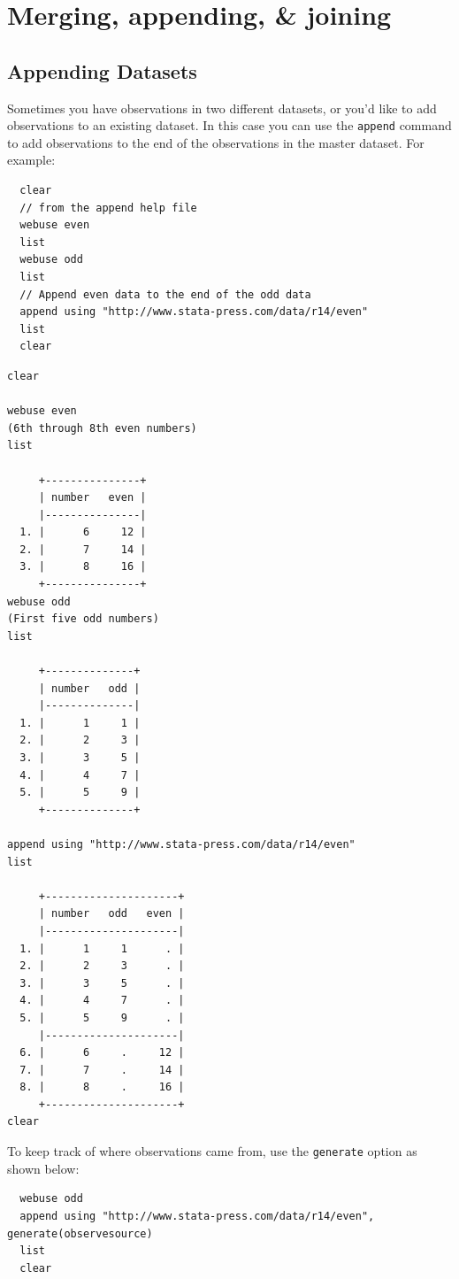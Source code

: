 \documentclass[]{book}
\begin{document}
\section{Merging, appending, \&
joining}\label{merging-appending-joining}

\subsection{Appending Datasets}\label{appending-datasets}

Sometimes you have observations in two different datasets, or you'd like
to add observations to an existing dataset. In this case you can use the
\texttt{append} command to add observations to the end of the
observations in the master dataset. For example:

\begin{verbatim}
  clear
  // from the append help file
  webuse even
  list
  webuse odd
  list
  // Append even data to the end of the odd data
  append using "http://www.stata-press.com/data/r14/even"
  list
  clear
\end{verbatim}

\begin{verbatim}
clear

webuse even
(6th through 8th even numbers)
list

     +---------------+
     | number   even |
     |---------------|
  1. |      6     12 |
  2. |      7     14 |
  3. |      8     16 |
     +---------------+
webuse odd
(First five odd numbers)
list

     +--------------+
     | number   odd |
     |--------------|
  1. |      1     1 |
  2. |      2     3 |
  3. |      3     5 |
  4. |      4     7 |
  5. |      5     9 |
     +--------------+

append using "http://www.stata-press.com/data/r14/even"
list

     +---------------------+
     | number   odd   even |
     |---------------------|
  1. |      1     1      . |
  2. |      2     3      . |
  3. |      3     5      . |
  4. |      4     7      . |
  5. |      5     9      . |
     |---------------------|
  6. |      6     .     12 |
  7. |      7     .     14 |
  8. |      8     .     16 |
     +---------------------+
clear
\end{verbatim}

To keep track of where observations came from, use the \texttt{generate}
option as shown below:

\begin{verbatim}
  webuse odd
  append using "http://www.stata-press.com/data/r14/even", generate(observesource)
  list
  clear
\end{verbatim}
\end{document}
